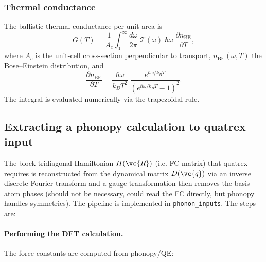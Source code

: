 \subsubsection{Thermal conductance}

The ballistic thermal conductance per unit area is
\begin{equation}\label{eq:G_thermal}
  G(T) = \frac{1}{A_c}
      \int_0^\infty \frac{d\omega}{2\pi}\;
      \bar{\mathcal{T}}(\omega)\;\hbar\omega\;
      \frac{\partial n_\mathrm{BE}}{\partial T},
\end{equation}
where $A_c$ is the unit-cell cross-section perpendicular to transport,
$n_\mathrm{BE}(\omega, T)$ the Bose--Einstein distribution, and
\begin{equation}
  \frac{\partial n_\mathrm{BE}}{\partial T}
  = \frac{\hbar\omega}{k_B T^2}\;
    \frac{e^{\hbar\omega / k_B T}}{(e^{\hbar\omega / k_B T} - 1)^2}.
\end{equation}
The integral is evaluated numerically via the trapezoidal rule.


\subsection{Extracting a phonopy calculation to quatrex input}
\label{sec:extraction}

The block-tridiagonal Hamiltonian $H(\vc{R})$ (i.e. FC matrix) that quatrex requires
is reconstructed from the dynamical matrix $D(\vc{q})$ via an inverse discrete Fourier
transform and a gauge transformation then removes the basis-atom phases (should not be necessary,
could read the FC directly, but phonopy handles symmetries).  The pipeline is implemented in \texttt{phonon\_inputs}. The steps are:

\paragraph{Performing the DFT calculation.}
\label{sec:performing_dft}The force constants are computed from phonopy/QE:

